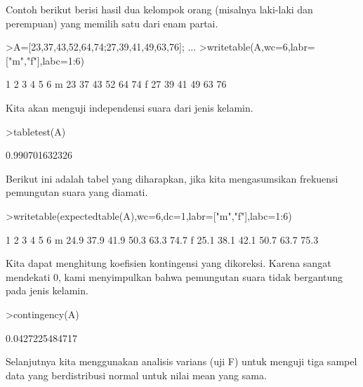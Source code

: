\documentclass[a4paper,10pt]{article}
\begin{document}
\begin{eulernotebook}
\begin{eulercomment}
\begin{eulercomment}
\begin{eulercomment}
Contoh berikut berisi hasil dua kelompok orang (misalnya laki-laki dan
perempuan) yang memilih satu dari enam partai.
\end{eulercomment}
\begin{eulerprompt}
>A=[23,37,43,52,64,74;27,39,41,49,63,76];  ...
>writetable(A,wc=6,labr=["m","f"],labc=1:6)
\end{eulerprompt}
\begin{euleroutput}
             1     2     3     4     5     6
       m    23    37    43    52    64    74
       f    27    39    41    49    63    76
\end{euleroutput}
\begin{eulercomment}
Kita akan menguji independensi suara dari jenis kelamin.
\end{eulercomment}
\begin{eulerprompt}
>tabletest(A)
\end{eulerprompt}
\begin{euleroutput}
  0.990701632326
\end{euleroutput}
\begin{eulercomment}
Berikut ini adalah tabel yang diharapkan, jika kita mengasumsikan
frekuensi pemungutan suara yang diamati.
\end{eulercomment}
\begin{eulerprompt}
>writetable(expectedtable(A),wc=6,dc=1,labr=["m","f"],labc=1:6)
\end{eulerprompt}
\begin{euleroutput}
             1     2     3     4     5     6
       m  24.9  37.9  41.9  50.3  63.3  74.7
       f  25.1  38.1  42.1  50.7  63.7  75.3
\end{euleroutput}
\begin{eulercomment}
Kita dapat menghitung koefisien kontingensi yang dikoreksi. Karena
sangat mendekati 0, kami menyimpulkan bahwa pemungutan suara tidak
bergantung pada jenis kelamin.
\end{eulercomment}
\begin{eulerprompt}
>contingency(A)
\end{eulerprompt}
\begin{euleroutput}
  0.0427225484717
\end{euleroutput}
\begin{eulercomment}
\begin{eulercomment}
\begin{eulercomment}
Selanjutnya kita menggunakan analisis varians (uji F) untuk menguji
tiga sampel data yang berdistribusi normal untuk nilai mean yang sama.

\end{eulercomment}
\end{eulercomment}
\end{eulercomment}
\end{eulercomment}
\end{eulercomment}
\end{eulernotebook}
\end{document}
